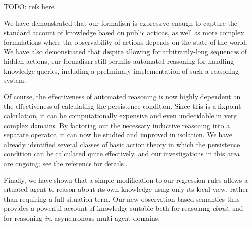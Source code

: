 TODO: refs here.

We have demonstrated that our formalism is expressive enough to capture
the standard account of knowledge based on public actions, as well
as more complex formulations where the observability of actions depends
on the state of the world. We have also demonstrated that despite
allowing for arbitrarily-long sequences of hidden actions, our formalism
still permits automated reasoning for handling knowledge queries,
including a preliminary implementation of such a reasoning system.

Of course, the effectiveness of automated reasoning is now highly
dependent on the effectiveness of calculating the persistence condition.
Since this is a fixpoint calculation, it can be computationally expensive
and even undecidable in very complex domains. By factoring out the
necessary inductive reasoning into a separate operator, it can now
be studied and improved in isolation. We have already identified several
classes of basic action theory in which the persistence condition
can be calculated quite effectively, and our investigations in this
area are ongoing; see the reference for details \citep{kelly07sc_persistence}.

Finally, we have shown that a simple modification to our regression
rules allows a situated agent to reason about its own knowledge using
only its local view, rather than requiring a full situation term.
Our new observation-based semantics thus provides a powerful account
of knowledge suitable both for reasoning \emph{about}, and for reasoning
\emph{in}, asynchronous multi-agent domains.

